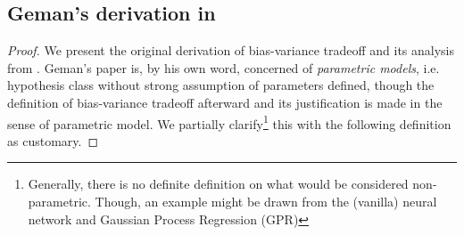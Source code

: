 \documentclass[10pt]{article}
\begin{document}
\subsection{Geman's derivation in \cite{6797087}}

\begin{proof}
    We present the original derivation of bias-variance tradeoff and its analysis from \cite{6797087}. Geman's paper is, by his own word, concerned of \textit{parametric models}, i.e. hypothesis class without strong assumption of parameters defined, though the definition of bias-variance tradeoff afterward and its justification is made in the sense of parametric model. We partially clarify\footnote{Generally, there is no definite definition on what would be considered non-parametric. Though, an example might be drawn from the (vanilla) neural network and Gaussian Process Regression (GPR)} this with the following definition as customary. 


\end{proof}
\end{document}
